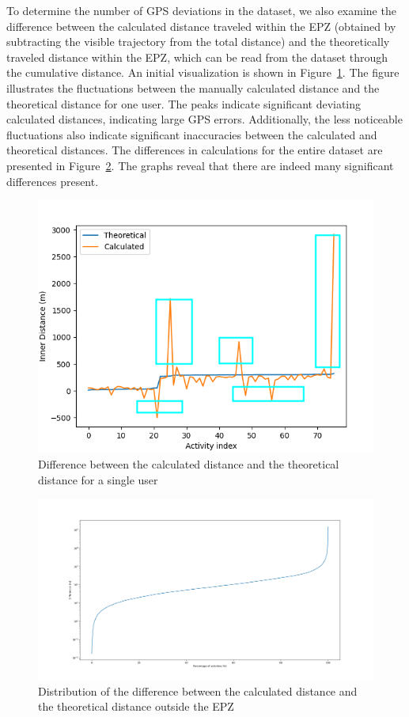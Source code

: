 \documentclass[conference]{IEEEtran}
\begin{document}
To determine the number of GPS deviations in the dataset, we also examine the
difference between the calculated distance traveled within the EPZ (obtained by
subtracting the visible trajectory from the total distance) and the
theoretically traveled distance within the EPZ, which can be read from the
dataset through the cumulative distance. An initial visualization is shown in
Figure~\ref{fig:difference_noCDF}. The figure illustrates the fluctuations
between the manually calculated distance and the theoretical distance for one
user. The peaks indicate significant deviating calculated distances, indicating
large GPS errors. Additionally, the less noticeable fluctuations also indicate
significant inaccuracies between the calculated and theoretical distances. The
differences in calculations for the entire dataset are presented in
Figure~\ref{fig:differences_log}. The graphs reveal that there are indeed many
significant differences present.
\begin{figure}[h]
    \centering
    \includegraphics[width=\linewidth]{fig/Afwijkingen&Analyses/Graphs/Verschil_Theoretische_innerDistance.png}
    \caption{Difference between the calculated distance and the theoretical distance for a single user}\label{fig:difference_noCDF}
\end{figure}
\begin{figure}[h]
    \centering
    \includegraphics[width=\linewidth]{fig/Afwijkingen&Analyses/Graphs/100_Differences_tov_theoretische_BefSmoothening.png}
    \caption{Distribution of the difference between the calculated distance and the theoretical distance outside the EPZ}\label{fig:differences_log}
\end{figure}
\end{document}
